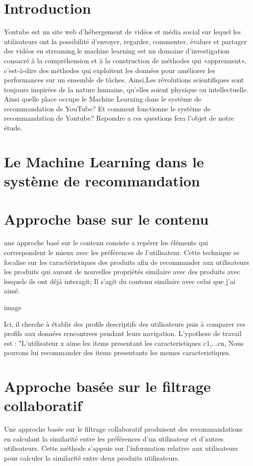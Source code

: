 \documentclass[12pt,a4paper]{article}
\begin{document}
\section*{Introduction}
  Youtube  est un site web d'hébergement de vidéos et média social sur lequel les utilisateurs ont la possibilité d'envoyer, regarder, 
commenter, évaluer et partager des vidéos en streaming.le machine learning est un domaine d'investigation consacré à la compréhension et 
à la construction de méthodes qui
 «apprennent», c'est-à-dire des méthodes qui exploitent les données pour améliorer les performances sur un ensemble de tâches. Ainsi,Les 
révolutions scientifiques sont toujours inspirées de la nature humaine, qu'elles soient physique ou intellectuelle. Ainsi 
quelle place occupe le Machine Learning dans le système de recommandation de YouTube? Et comment fonctionne le système de recommandation
 de Youtube? Repondre a ces questions fera l'objet de notre étude. 
 
\section{Le Machine Learning dans le système de recommandation}


 
\section{Approche base sur le contenu}	
 une approche basé sur le contenu consiste a repérer les éléments qui correspondent le mieux avec les préférences de l'utilisateur. Cette technique se focalise sur les caractéristiques des produits afin de recommander aux utilisateurs les produits qui auront de nouvelles propriétés 
similaire avec des produits avec lesquels ils ont déjà interagit; Il s'agit du contenu similaire avec celui que j'ai aimé. 

image

Ici, il cherche à établir des profils descriptifs des utilisateurs puis à comparer ces profils aux données rencontrees pendant leurs navigation. L'ypothese de travail est : "L'utilisateur x aime les items presentant les caracteristiques {c1,...cn}, Nous pouvons lui recommander des items presentants les memes caracteristiques.
\section{Approche basée sur le filtrage collaboratif }	
Une approche basée sur le filtrage collaboratif produisent des recommandations en calculant la similarité entre les préférences d'un utilisateur et d'autres utilisateurs. Cette méthode s'appuie sur l'information relative aux utilisateurs pour calculer la similarité entre deux produits utilisateurs.
\end{document}
